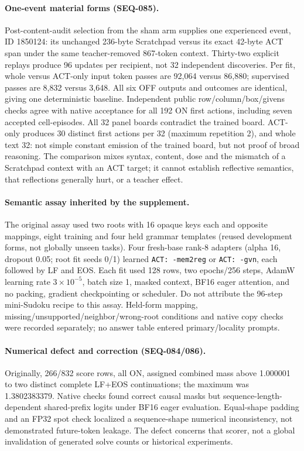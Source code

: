 \documentclass{article}
\begin{document}
\paragraph{One-event material forms (SEQ-085).} Post-content-audit selection from the sham arm supplies one experienced event, ID 1850124: its unchanged 236-byte Scratchpad versus its exact 42-byte ACT span under the same teacher-removed 867-token context. Thirty-two explicit replays produce 96 updates per recipient, not 32 independent discoveries. Per fit, whole versus ACT-only input token passes are 92,064 versus 86,880; supervised passes are 8,832 versus 3,648. All six OFF outputs and outcomes are identical, giving one deterministic baseline. Independent public row/column/box/givens checks agree with native acceptance for all 192 ON first actions, including seven accepted cell-episodes. All 32 panel boards contradict the trained board. ACT-only produces 30 distinct first actions per 32 (maximum repetition 2), and whole text 32: not simple constant emission of the trained board, but not proof of broad reasoning. The comparison mixes syntax, content, dose and the mismatch of a Scratchpad context with an ACT target; it cannot establish reflective semantics, that reflections generally hurt, or a teacher effect.

\paragraph{Semantic assay inherited by the supplement.} The original assay used two roots with 16 opaque keys each and opposite mappings, eight training and four held grammar templates (reused development forms, not globally unseen tasks). Four fresh-base rank-8 adapters (alpha 16, dropout 0.05; root fit seeds 0/1) learned \texttt{ACT: -mem2reg} or \texttt{ACT: -gvn}, each followed by LF and EOS. Each fit used 128 rows, two epochs/256 steps, AdamW learning rate $3\times10^{-5}$, batch size 1, masked context, BF16 eager attention, and no packing, gradient checkpointing or scheduler. Do not attribute the 96-step mini-Sudoku recipe to this assay. Held-form mapping, missing/unsupported/neighbor/wrong-root conditions and native copy checks were recorded separately; no answer table entered primary/locality prompts.

\paragraph{Numerical defect and correction (SEQ-084/086).} Originally, 266/832 score rows, all ON, assigned combined mass above 1.000001 to two distinct complete LF+EOS continuations; the maximum was 1.3802383379. Native checks found correct causal masks but sequence-length-dependent shared-prefix logits under BF16 eager evaluation. Equal-shape padding and an FP32 spot check localized a sequence-shape numerical inconsistency, not demonstrated future-token leakage. The defect concerns that scorer, not a global invalidation of generated solve counts or historical experiments.
\end{document}
